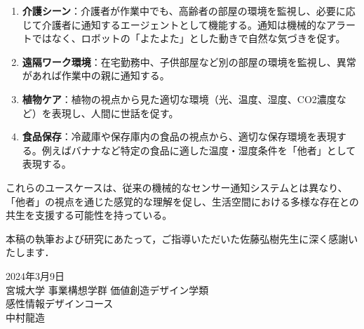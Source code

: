 \documentclass{cuxarticle}
\begin{document}
\begin{enumerate}
  \item \textbf{介護シーン}：介護者が作業中でも、高齢者の部屋の環境を監視し、必要に応じて介護者に通知するエージェントとして機能する。通知は機械的なアラートではなく、ロボットの「よたよた」とした動きで自然な気づきを促す。

  \item \textbf{遠隔ワーク環境}：在宅勤務中、子供部屋など別の部屋の環境を監視し、異常があれば作業中の親に通知する。

  \item \textbf{植物ケア}：植物の視点から見た適切な環境（光、温度、湿度、CO2濃度など）を表現し、人間に世話を促す。

  \item \textbf{食品保存}：冷蔵庫や保存庫内の食品の視点から、適切な保存環境を表現する。例えばバナナなど特定の食品に適した温度・湿度条件を「他者」として表現する。
\end{enumerate}

これらのユースケースは、従来の機械的なセンサー通知システムとは異なり、「他者」の視点を通じた感覚的な理解を促し、生活空間における多様な存在との共生を支援する可能性を持っている。

本稿の執筆および研究にあたって，ご指導いただいた佐藤弘樹先生に深く感謝いたします．

\vspace{3\zh}
\begin{flushright}
  2024年3月9日 \\
  宮城大学 事業構想学群 価値創造デザイン学類 \\
  感性情報デザインコース \\
  中村龍造
\end{flushright}

\newpage
\renewcommand{\refname}{\huge 参考文献}


\end{document}
